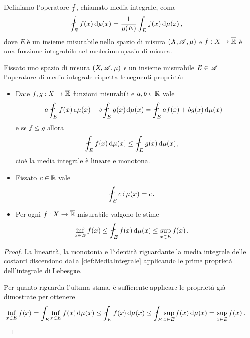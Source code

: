 \begin{definition} \label{def:MediaIntegrale}
	Definiamo l'operatore $\aint$, chiamato media integrale, come
	\begin{equation*}
		\aint_E f(x)\de\mu(x)=\frac 1{\mu(E)}\int_E f(x)\de\mu(x)\virgola
	\end{equation*}
	dove $E$ è un insieme misurabile nello spazio di misura $(X,\mathscr A,\mu)$ e $f:X\to\overline{\mathbb R}$ è una funzione integrabile nel medesimo spazio di misura.
\end{definition}
\begin{remark}\label{nota:ProprietaMediaIntegrale}
	Fissato uno spazio di misura $(X,\mathscr A,\mu)$ e un insieme misurabile $E\in\mathscr A$ l'operatore di media integrale rispetta le seguenti proprietà:
	\begin{itemize}
		\item Date $f,g:X\to\overline{\mathbb R}$ funzioni misurabili e $a,b\in\mathbb R$ vale
		\begin{equation*}
			a\aint_E f(x)\de\mu(x)+b\aint_E g(x)\de\mu(x)=\aint_E af(x)+bg(x)\de\mu(x)
		\end{equation*}
		e se $f\le g$ allora
		\begin{equation*}
			\aint_E f(x)\de\mu(x)\le \aint_E g(x)\de\mu(x)\virgola
		\end{equation*}
		cioè la media integrale è lineare e monotona.
		\item Fissato $c\in\mathbb R$ vale
		\begin{equation*}
			\aint_E c\de\mu(x)=c\punto
		\end{equation*}
		\item Per ogni $f:X\to\overline{\mathbb R}$ misurabile valgono le stime
		\begin{equation*}
			\inf_{x\in E}f(x)\le \aint_E f(x)\de\mu(x) \le \sup_{x\in E}f(x)\punto
		\end{equation*}
	\end{itemize}
\end{remark}
\begin{proof}
	La linearità, la monotonia e l'identità riguardante la media integrale delle costanti discendono dalla \cref{def:MediaIntegrale} applicando le prime proprietà dell'integrale di Lebesgue.
	
	Per quanto riguarda l'ultima stima, è sufficiente applicare le proprietà già dimostrate per ottenere
	\begin{equation*}
		\inf_{x\in E}f(x) = \aint_E \inf_{x\in E} f(x)\de\mu(x)\le \aint_E f(x)\de\mu(x) \le \aint_E \sup_{x\in E} f(x)\de\mu(x) =\sup_{x\in E}f(x)\punto
	\end{equation*}
\end{proof}


